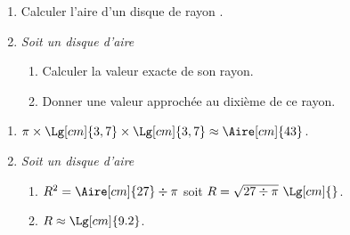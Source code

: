 \begin{methode}
    \exercice
        \begin{enumerate}
            \item Calculer l'aire d'un disque de rayon .
            \item \textit{Soit un disque d'aire }
            \begin{enumerate}
                \item Calculer la valeur exacte de son rayon.
                \item Donner une valeur approchée au dixième de ce rayon.
            \end{enumerate}
        \end{enumerate}
    \correction
    \begin{enumerate}
        \item $\pi\times \Lg[cm]{3,7}\times \Lg[cm]{3,7}\approx\Aire[cm]{43}$.
        \item \textit{Soit un disque d'aire }
        \begin{enumerate}
            \item $R^2=\Aire[cm]{27}\div \pi$ soit $R=\sqrt{27\div \pi}~\Lg[cm]{}$.
            \item $R\approx\Lg[cm]{9.2}$.
        \end{enumerate}
    \end{enumerate}
\end{methode}    
